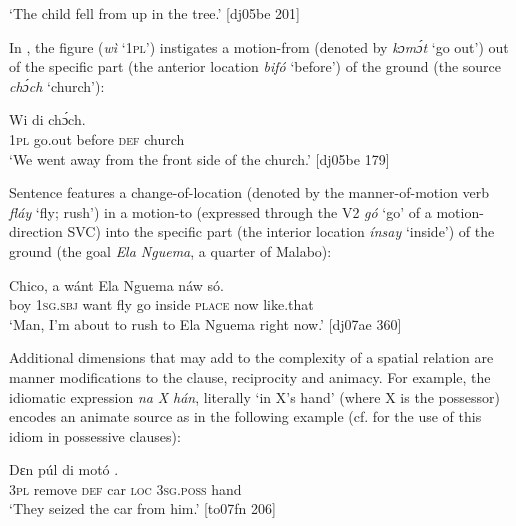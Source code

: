 \glt ‘The child fell from up in the tree.’ [dj05be 201]
\z

In , the figure (\textit{wì} ‘\textsc{1pl}’) instigates a motion-from (denoted by \textit{kɔmɔ́t} ‘go out’) out of the specific part (the anterior location \textit{bifó} ‘before’) of the ground (the source \textit{chɔ́ch} ‘church’): 


\ea%
    \label{ex:key:989}
    \gll Wi        di  chɔ́ch.\\
\textsc{1pl}  go.out  before  \textsc{def}  church\\

\glt ‘We went away from the front side of the church.’ [dj05be 179]
\z

Sentence  features a change-of-location (denoted by the manner-of-motion verb \textit{fláy} ‘fly; rush’) in a motion-to (expressed through the V2 \textit{gó} ‘go’ of a motion-direction SVC) into the specific part (the interior location \textit{ínsay} ‘inside’) of the ground (the goal \textit{Ela Nguema}, a quarter of Malabo):


\ea%
    \label{ex:key:990}
    \gll Chico,  a    wánt        {Ela  Nguema}  náw    só.\\
boy    \textsc{1sg.sbj}  want  fly  go  inside  \textsc{place}    now    like.that\\

\glt ‘Man, I’m about to rush to Ela Nguema right now.’ [dj07ae 360]
\z

Additional dimensions that may add to the complexity of a spatial relation are manner modifications to the clause, reciprocity and animacy. For example, the idiomatic expression \textit{na} \textit{X hán}, literally ‘in X’s hand’ (where X is the possessor) encodes an animate source as in the following example (cf.  for the use of this idiom in possessive clauses):


\ea%
    \label{ex:key:991}
    \gll Dɛn  púl    di  motó        .\\
\textsc{3pl}  remove  \textsc{def}  car    \textsc{loc}  \textsc{3sg.poss}  hand\\

\glt ‘They seized the car from him.’ [to07fn 206]
\z

